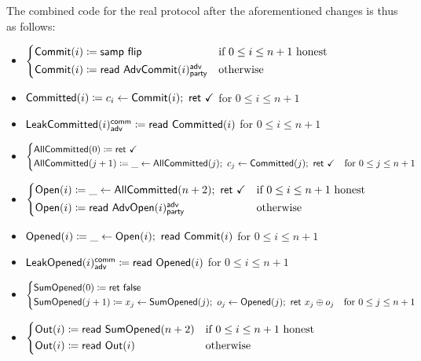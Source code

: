 \noindent The combined code for the real protocol after the aforementioned changes is thus as follows:

\begin{itemize}
\item {\color{blue} $\begin{cases*} \Commit(i) \coloneqq \samp{\flip} & \text{if $0 \leq i \leq n+1$ honest} \\ \Commit(i) \coloneqq \read{\AdvCommit(i)^\adv_\party} & \text{otherwise} \end{cases*}$}
\item {\color{magenta} $\mathsf{Committed}(i) \coloneqq c_i \leftarrow \mathsf{Commit}(i); \ \mathsf{ret} \ \checkmark$ for $0 \leq i \leq n+1$}
\item {\color{magenta} $\mathsf{LeakCommitted}(i)^{\mathsf{comm}}_{\mathsf{adv}} \coloneqq \mathsf{read} \ \mathsf{Committed}(i)$ for $0 \leq i \leq n+1$}
\item {\color{magenta} $\begin{cases*} \AllCommitted(0) \coloneqq \ret{\checkmark} & \\ \AllCommitted(j+1) \coloneqq \_ \leftarrow \AllCommitted(j); \ c_j \leftarrow \Committed(j); \ \ret{\checkmark} & \text{for $0 \leq j \leq n+1$} \end{cases*}$}
\item {\color{teal} $\begin{cases*} \Open(i) \coloneqq \_ \leftarrow \AllCommitted(n+2); \ \ret{\checkmark} & \text{if $0 \leq i \leq n+1$ honest} \\ \Open(i) \coloneqq \read{\AdvOpen(i)^\adv_\party} & \text{otherwise} \end{cases*}$}
\item {\color{red} $\mathsf{Opened}(i) \coloneqq \_ \leftarrow \mathsf{Open}(i); \ \mathsf{read} \ \mathsf{Commit}(i)$ for $0 \leq i \leq n+1$}
\item {\color{red} $\mathsf{LeakOpened}(i)^{\mathsf{comm}}_{\mathsf{adv}} \coloneqq \mathsf{read} \ \mathsf{Opened}(i)$ for $0 \leq i \leq n+1$}
\item {\color{red} $\begin{cases*} \SumOpened(0) \coloneqq \ret{\false} & \\ \SumOpened(j+1) \coloneqq x_j \leftarrow \SumOpened(j); \ o_j \leftarrow \Opened(j); \ \ret{x_j \oplus o_j} & \text{for $0 \leq j \leq n+1$} \end{cases*}$}
\item $\begin{cases*} \Out(i) \coloneqq \read{\SumOpened(n+2)} & \text{if $0 \leq i \leq n+1$ honest} \\ \Out(i) \coloneqq \read{\Out(i)} & \text{otherwise} \end{cases*}$
\end{itemize}

